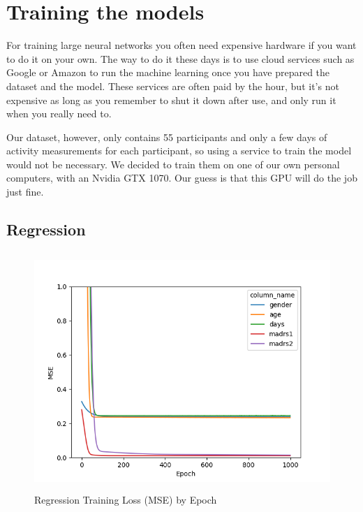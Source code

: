 \section{Training the models}

For training large neural networks you often need expensive hardware if you want to do it on your own. 
The way to do it these days is to use cloud services such as Google or Amazon to run the machine learning once you have prepared the dataset and the model. 
These services are often paid by the hour, but it's not expensive as long as you remember to shut it down after use, and only run it when you really need to.

Our dataset, however, only contains 55 participants and only a few days of activity measurements for each participant, 
so using a service to train the model would not be necessary. We decided to train them on one of our own personal computers, 
with an Nvidia GTX 1070. Our guess is that this GPU will do the job just fine. 
 
\subsection{Regression}

\begin{figure}
      \includegraphics[height=9cm]{img/regression/results_kerasregressor_1k_epochs.png}
      \caption{Regression Training Loss (MSE) by Epoch}
      \label{figure:regression_training_loss}
\end{figure}

